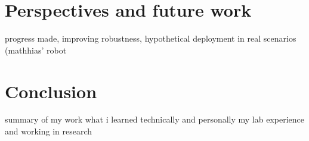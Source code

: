 \section{Perspectives and future work}
progress made, improving robustness, hypothetical deployment in real scenarios (mathhias' robot
\clearpage
\section{Conclusion}
summary of my work
what i learned technically and personally
my lab experience and working in research






